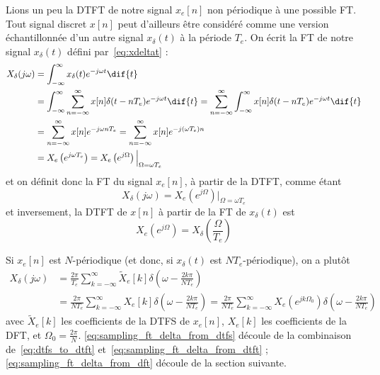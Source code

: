 \documentclass{article}
\begin{document}
Lions un peu la DTFT de notre signal $x_e[n]$ non périodique à une possible FT. Tout signal discret $x[n]$ peut d'ailleurs être considéré comme une version échantillonnée d'un autre signal $x_\delta(t)$ à la période $T_e$. On écrit la FT de notre signal $x_\delta(t)$ défini par~\ref{eq:xdeltat} :
\begin{align*}
X_\delta(j\omega) &= \int_{-\infty}^{\infty} x_\delta(t) e^{-j\omega t} \dif{t} \\
&= \int_{-\infty}^{\infty} \sum_{n=-\infty}^{\infty} x[n] \delta(t-nT_e) e^{-j\omega t} \dif{t} = \sum_{n=-\infty}^{\infty} \int_{-\infty}^{\infty} x[n] \delta(t-nT_e) e^{-j\omega t} \dif{t} \\
&= \sum_{n=-\infty}^{\infty} x[n] e^{-j\omega n T_e} = \sum_{n=-\infty}^{\infty} x[n] e^{-j(\omega T_e) n} \\
&= X_e\left(e^{j \omega T_e}\right) = X_e\left(e^{j\Omega}\right) \Big\rvert_{\Omega = \omega T_e}
\end{align*}
et on définit donc la FT du signal $x_e[n]$, à partir de la DTFT, comme étant
\begin{equation}
X_\delta(j\omega) = X_e\left(e^{j\Omega}\right)\Big\rvert_{\Omega = \omega T_e}
\label{eq:sampling_ft_delta_from_dtft}
\end{equation}
et inversement, la DTFT de $x[n]$ à partir de la FT de $x_\delta(t)$ est
\begin{equation}
X_e\left(e^{j\Omega}\right) = X_\delta\left(\frac{\Omega}{T_e}\right)
\label{eq:sampling_dtft_from_ft_delta}
\end{equation}

Si $x_e[n]$ est $N$-périodique (et donc, si $x_\delta(t)$ est $NT_e$-périodique), on a plutôt
\begin{align}
X_\delta(j\omega) &= \frac{2\pi}{T_e} \sum_{k=-\infty}^{\infty} \tilde{X}_e[k] \delta\left(\omega - \frac{2k\pi}{NT_e}\right) \label{eq:sampling_ft_delta_from_dtfs} \\
&= \frac{2\pi}{N T_e} \sum_{k=-\infty}^{\infty} X_e[k] \delta\left(\omega - \frac{2k\pi}{NT_e}\right) = \frac{2\pi}{N T_e} \sum_{k=-\infty}^{\infty} X_e\left(e^{jk\Omega_0}\right) \delta\left(\omega - \frac{2k\pi}{NT_e}\right) \label{eq:sampling_ft_delta_from_dft}
\end{align}
avec $\tilde{X}_e[k]$ les coefficients de la DTFS de $x_e[n]$, $X_e[k]$ les coefficients de la DFT, et $\Omega_0=\frac{2\pi}{N}$. \eqref{eq:sampling_ft_delta_from_dtfs} découle de la combinaison de~\eqref{eq:dtfs_to_dtft} et~\eqref{eq:sampling_ft_delta_from_dtft} ; \eqref{eq:sampling_ft_delta_from_dft} découle de la section suivante.
\end{document}
